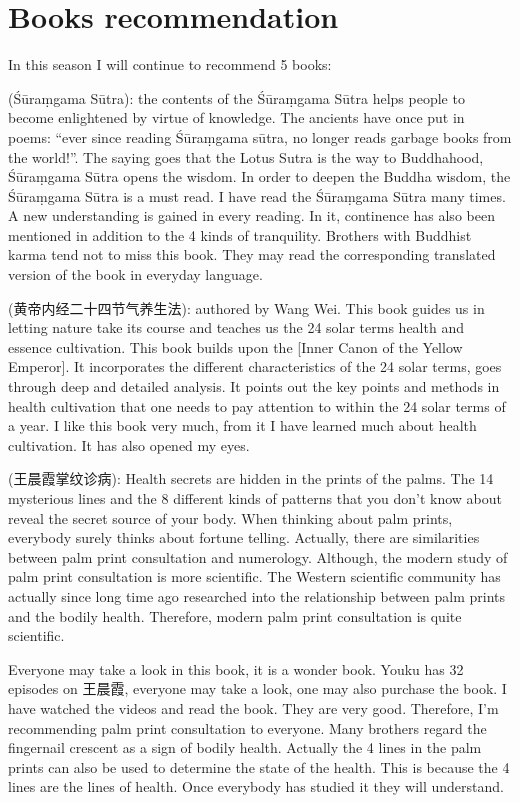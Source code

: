 \documentclass[
]{book}
\begin{document}
\hypertarget{books-recommendation-2}{%
\section{Books recommendation}\label{books-recommendation-2}}

In this season I will continue to recommend 5 books:

(‎Śūraṃgama Sūtra): the contents of the Śūraṃgama Sūtra helps people to become enlightened by virtue of knowledge. The ancients have once put in poems: ``ever since reading Śūraṃgama sūtra, no longer reads garbage books from the world!''. The saying goes that the Lotus Sutra is the way to Buddhahood, Śūraṃgama Sūtra opens the wisdom. In order to deepen the Buddha wisdom, the Śūraṃgama Sūtra is a must read. I have read the Śūraṃgama Sūtra many times. A new understanding is gained in every reading. In it, continence has also been mentioned in addition to the 4 kinds of tranquility. Brothers with Buddhist karma tend not to miss this book. They may read the corresponding translated version of the book in everyday language.

(黄帝内经二十四节气养生法): authored by Wang Wei. This book guides us in letting nature take its course and teaches us the 24 solar terms health and essence cultivation. This book builds upon the {[}Inner Canon of the Yellow Emperor{]}. It incorporates the different characteristics of the 24 solar terms, goes through deep and detailed analysis. It points out the key points and methods in health cultivation that one needs to pay attention to within the 24 solar terms of a year. I like this book very much, from it I have learned much about health cultivation. It has also opened my eyes.

(王晨霞掌纹诊病): Health secrets are hidden in the prints of the palms. The 14 mysterious lines and the 8 different kinds of patterns that you don't know about reveal the secret source of your body. When thinking about palm prints, everybody surely thinks about fortune telling. Actually, there are similarities between palm print consultation and numerology. Although, the modern study of palm print consultation is more scientific. The Western scientific community has actually since long time ago researched into the relationship between palm prints and the bodily health. Therefore, modern palm print consultation is quite scientific.

Everyone may take a look in this book, it is a wonder book. Youku has 32 episodes on 王晨霞, everyone may take a look, one may also purchase the book. I have watched the videos and read the book. They are very good. Therefore, I'm recommending palm print consultation to everyone. Many brothers regard the fingernail crescent as a sign of bodily health. Actually the 4 lines in the palm prints can also be used to determine the state of the health. This is because the 4 lines are the lines of health. Once everybody has studied it they will understand.
\end{document}
